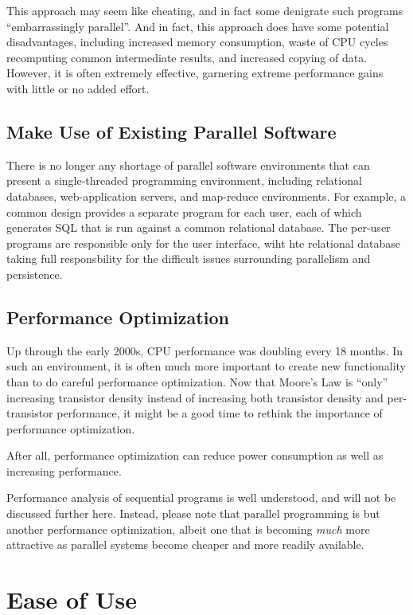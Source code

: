 This approach may seem like cheating, and in fact some denigrate such
programs ``embarrassingly parallel''.
And in fact, this approach does have some potential disadvantages,
including increased memory consumption, waste of CPU cycles recomputing
common intermediate results, and increased copying of data.
However, it is often  extremely effective, garnering extreme performance
gains with little or no added effort.

\subsection{Make Use of Existing Parallel Software}
\label{sec:intro:Make Use of Existing Parallel Software}

There is no longer any shortage of parallel software environments that
can present a single-threaded programming environment,
including relational
databases, web-application servers, and map-reduce environments.
For example, a common design provides a separate program for each
user, each of which generates SQL that is run against a common
relational database.
The per-user programs are responsible only for the user interface,
wiht hte relational database taking full responsbility for the
difficult issues surrounding parallelism and persistence.

\subsection{Performance Optimization}
\label{sec:intro:Performance Optimization}

Up through the early 2000s, CPU performance was doubling every 18 months.
In such an environment, it is often much more important to create new
functionality than to do careful performance optimization.
Now that Moore's Law is ``only'' increasing transistor density instead
of increasing both transistor density and per-transistor performance,
it might be a good time to rethink the importance of performance
optimization.

After all, performance optimization can reduce power consumption as
well as increasing performance.

Performance analysis of sequential programs is well understood,
and will not be discussed further here.
Instead, please note that parallel programming is but another performance
optimization, albeit one that is becoming \emph{much} more attractive
as parallel systems become cheaper and more readily available.

\section{Ease of Use}
\label{sec:intro:Ease of Use}

